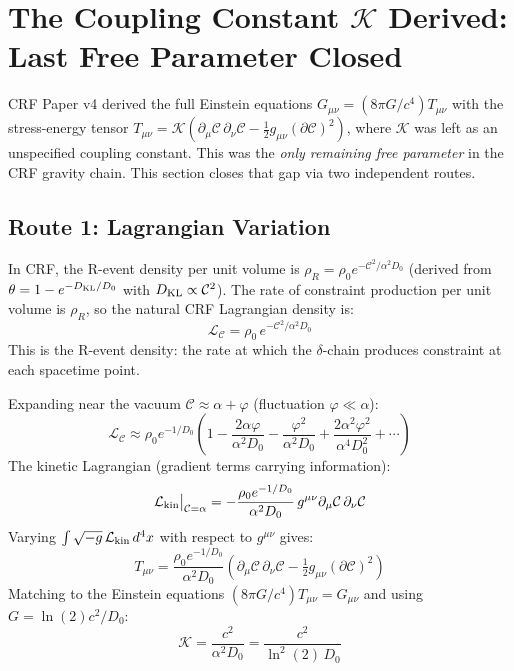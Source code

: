 \documentclass[12pt, a4paper]{article}
\begin{document}
\section{The Coupling Constant $\mathcal{K}$ Derived: Last Free Parameter Closed}

CRF Paper v4 derived the full Einstein equations $G_{\mu\nu} = (8\pi G/c^4)T_{\mu\nu}$
with the stress-energy tensor $T_{\mu\nu} = \mathcal{K}(\partial_\mu\mathcal{C}\,\partial_\nu\mathcal{C}
- \frac{1}{2}g_{\mu\nu}(\partial\mathcal{C})^2)$, where $\mathcal{K}$ was left as an unspecified
coupling constant. This was the \emph{only remaining free parameter} in the CRF gravity chain.
This section closes that gap via two independent routes.

\subsection{Route 1: Lagrangian Variation}

\begin{derivedbox}[title={CRF Lagrangian Density and $\mathcal{K}$ from Variation}]
In CRF, the R-event density per unit volume is $\rho_R = \rho_0 e^{-\mathcal{C}^2/\alpha^2 D_0}$
(derived from $\theta = 1 - e^{-D_{\rm KL}/D_0}$ with $D_{\rm KL}\propto\mathcal{C}^2$).
The rate of constraint production per unit volume is $\rho_R$, so the natural CRF
Lagrangian density is:
\[
  \mathcal{L}_\mathcal{C} = \rho_0\,e^{-\mathcal{C}^2/\alpha^2 D_0}
\]
This is the R-event density: the rate at which the $\delta$-chain produces constraint
at each spacetime point.

Expanding near the vacuum $\mathcal{C}\approx\alpha+\varphi$ (fluctuation $\varphi\ll\alpha$):
\[
  \mathcal{L}_\mathcal{C} \approx \rho_0 e^{-1/D_0}\!\left(
    1 - \frac{2\alpha\varphi}{\alpha^2 D_0} - \frac{\varphi^2}{\alpha^2 D_0}
    + \frac{2\alpha^2\varphi^2}{\alpha^4 D_0^2} + \cdots\right)
\]
The kinetic Lagrangian (gradient terms carrying information):
\[
  \mathcal{L}_{\rm kin}\big|_{\mathcal{C}=\alpha}
  = -\frac{\rho_0 e^{-1/D_0}}{\alpha^2 D_0}\,g^{\mu\nu}\partial_\mu\mathcal{C}\,\partial_\nu\mathcal{C}
\]
Varying $\int\sqrt{-g}\,\mathcal{L}_{\rm kin}\,d^4x$ with respect to $g^{\mu\nu}$ gives:
\[
  T_{\mu\nu} = \frac{\rho_0 e^{-1/D_0}}{\alpha^2 D_0}\left(
    \partial_\mu\mathcal{C}\,\partial_\nu\mathcal{C} - \tfrac{1}{2}g_{\mu\nu}(\partial\mathcal{C})^2
  \right)
\]
Matching to the Einstein equations $(8\pi G/c^4)T_{\mu\nu} = G_{\mu\nu}$ and using
$G = \ln(2)c^2/D_0$:
\[
  \mathcal{K} = \frac{c^2}{\alpha^2 D_0} = \frac{c^2}{\ln^2(2)\,D_0}
\]
\end{derivedbox}
\end{document}
